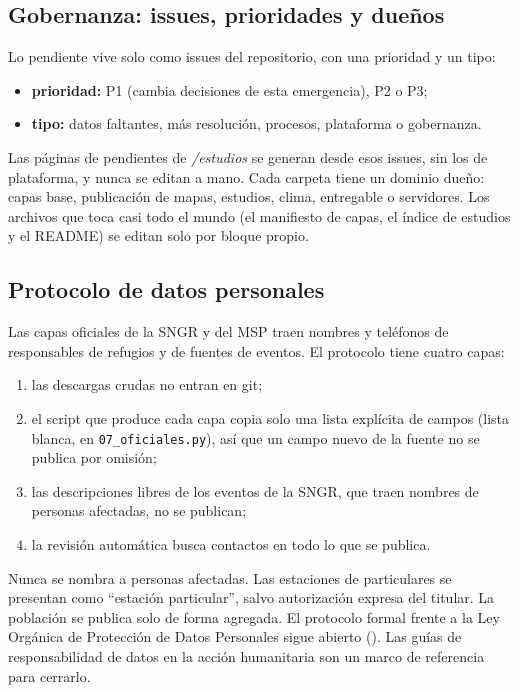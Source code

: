 \documentclass{sosg-informe}
\begin{document}
\subsection{Gobernanza: issues, prioridades y dueños}
Lo pendiente vive solo como issues del repositorio, con una prioridad y un tipo:
\begin{itemize}
  \item \textbf{prioridad:} P1 (cambia decisiones de esta emergencia), P2 o P3;
  \item \textbf{tipo:} datos faltantes, más resolución, procesos, plataforma o gobernanza.
\end{itemize}
Las páginas de pendientes de \emph{/estudios} se generan desde esos issues, sin los de plataforma, y nunca se editan a mano. Cada carpeta tiene un dominio dueño: capas base, publicación de mapas, estudios, clima, entregable o servidores. Los archivos que toca casi todo el mundo (el manifiesto de capas, el índice de estudios y el README) se editan solo por bloque propio.

\subsection{Protocolo de datos personales}
Las capas oficiales de la SNGR y del MSP traen nombres y teléfonos de responsables de refugios y de fuentes de eventos. El protocolo tiene cuatro capas:
\begin{enumerate}
  \item las descargas crudas no entran en git;
  \item el script que produce cada capa copia solo una lista explícita de campos (lista blanca, en \texttt{07\_oficiales.py}), así que un campo nuevo de la fuente no se publica por omisión;
  \item las descripciones libres de los eventos de la SNGR, que traen nombres de personas afectadas, no se publican;
  \item la revisión automática busca contactos en todo lo que se publica.
\end{enumerate}
Nunca se nombra a personas afectadas. Las estaciones de particulares se presentan como \enquote{estación particular}, salvo autorización expresa del titular. La población se publica solo de forma agregada. El protocolo formal frente a la Ley Orgánica de Protección de Datos Personales \citep{lopdp2021} sigue abierto (). Las guías de responsabilidad de datos en la acción humanitaria \citep{iasc2021} son un marco de referencia para cerrarlo.
\end{document}
